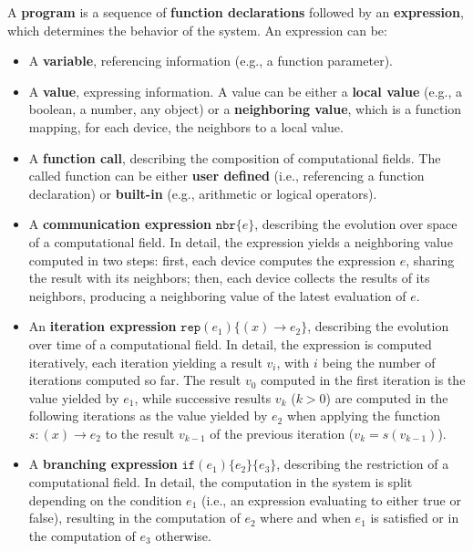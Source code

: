 A \textbf{program} is a sequence of \textbf{function declarations} followed by
an \textbf{expression}, which determines the behavior of the system. An
expression can be:
\begin{itemize}
  \item A \textbf{variable}, referencing information (e.g., a function
        parameter).
  \item A \textbf{value}, expressing information. A value can be either a
        \textbf{local value} (e.g., a boolean, a number, any object) or a
        \textbf{neighboring value}, which is a function mapping, for each
        device, the neighbors to a local value.
  \item A \textbf{function call}, describing the composition of computational
        fields. The called function can be either \textbf{user defined} (i.e.,
        referencing a function declaration) or \textbf{built-in} (e.g.,
        arithmetic or logical operators).
  \item A \textbf{communication expression} $\texttt{nbr}\{e\}$, describing the
        evolution over space of a computational field. In detail, the
        expression yields a neighboring value computed in two steps: first,
        each device computes the expression $e$, sharing the result with its
        neighbors; then, each device collects the results of its neighbors,
        producing a neighboring value of the latest evaluation of $e$.
  \item An \textbf{iteration expression} $\texttt{rep}(e_1)\{(x) \rightarrow
        e_2 \}$, describing the evolution over time of a computational field.
        In detail, the expression is computed iteratively, each iteration
        yielding a result $v_i$, with $i$ being the number of iterations
        computed so far. The result $v_0$ computed in the first iteration is
        the value yielded by $e_1$, while successive results $v_k$ ($k > 0$)
        are computed in the following iterations as the value yielded by $e_2$
        when applying the function $s: (x) \rightarrow e_2$ to the result
        $v_{k-1}$ of the previous iteration ($v_k = s(v_{k-1})$).
  \item A \textbf{branching expression} $\texttt{if}(e_1)\{e_2\}\{e_3\}$,
        describing the restriction of a computational field. In detail, the
        computation in the system is split depending on the condition $e_1$
        (i.e., an expression evaluating to either true or false), resulting in
        the computation of ${e_2}$ where and when $e_1$ is satisfied or in the
        computation of $e_3$ otherwise.


\end{itemize}

